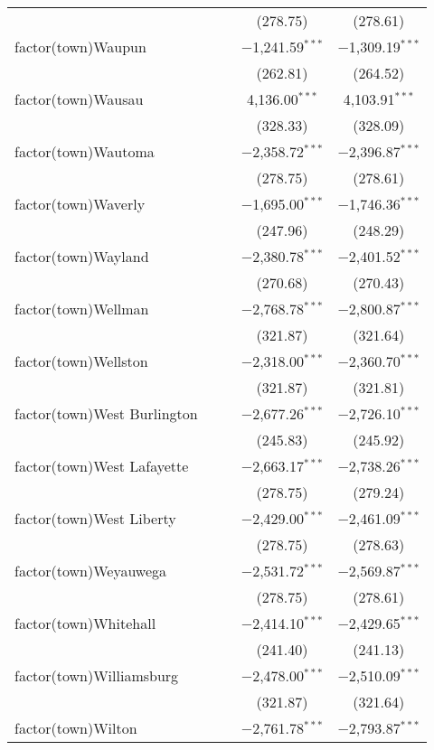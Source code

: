 \begin{table}[!htbp]
\begin{tabular}{@{\extracolsep{5pt}}lcccc}
  &  &  & (278.75) & (278.61) \\ 
  factor(town)Waupun &  &  & $-$1,241.59$^{***}$ & $-$1,309.19$^{***}$ \\ 
  &  &  & (262.81) & (264.52) \\ 
  factor(town)Wausau &  &  & 4,136.00$^{***}$ & 4,103.91$^{***}$ \\ 
  &  &  & (328.33) & (328.09) \\ 
  factor(town)Wautoma &  &  & $-$2,358.72$^{***}$ & $-$2,396.87$^{***}$ \\ 
  &  &  & (278.75) & (278.61) \\ 
  factor(town)Waverly &  &  & $-$1,695.00$^{***}$ & $-$1,746.36$^{***}$ \\ 
  &  &  & (247.96) & (248.29) \\ 
  factor(town)Wayland &  &  & $-$2,380.78$^{***}$ & $-$2,401.52$^{***}$ \\ 
  &  &  & (270.68) & (270.43) \\ 
  factor(town)Wellman &  &  & $-$2,768.78$^{***}$ & $-$2,800.87$^{***}$ \\ 
  &  &  & (321.87) & (321.64) \\ 
  factor(town)Wellston &  &  & $-$2,318.00$^{***}$ & $-$2,360.70$^{***}$ \\ 
  &  &  & (321.87) & (321.81) \\ 
  factor(town)West Burlington &  &  & $-$2,677.26$^{***}$ & $-$2,726.10$^{***}$ \\ 
  &  &  & (245.83) & (245.92) \\ 
  factor(town)West Lafayette &  &  & $-$2,663.17$^{***}$ & $-$2,738.26$^{***}$ \\ 
  &  &  & (278.75) & (279.24) \\ 
  factor(town)West Liberty &  &  & $-$2,429.00$^{***}$ & $-$2,461.09$^{***}$ \\ 
  &  &  & (278.75) & (278.63) \\ 
  factor(town)Weyauwega &  &  & $-$2,531.72$^{***}$ & $-$2,569.87$^{***}$ \\ 
  &  &  & (278.75) & (278.61) \\ 
  factor(town)Whitehall &  &  & $-$2,414.10$^{***}$ & $-$2,429.65$^{***}$ \\ 
  &  &  & (241.40) & (241.13) \\ 
  factor(town)Williamsburg &  &  & $-$2,478.00$^{***}$ & $-$2,510.09$^{***}$ \\ 
  &  &  & (321.87) & (321.64) \\ 
  factor(town)Wilton &  &  & $-$2,761.78$^{***}$ & $-$2,793.87$^{***}$ \\ 

\end{tabular}
\end{table}
